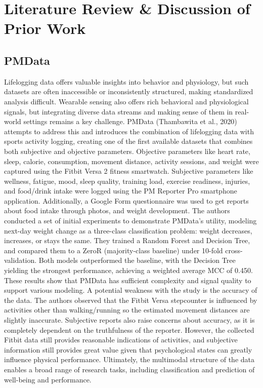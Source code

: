 \documentclass[12pt,letterpaper]{article}
\begin{document}
\section{Literature Review \& Discussion of Prior Work}

\subsection{PMData}
Lifelogging data offers valuable insights into behavior and physiology, but such datasets are often inaccessible or inconsistently structured, making standardized analysis difficult. Wearable sensing also offers rich behavioral and physiological signals, but integrating diverse data streams and making sense of them in real-world settings remains a key challenge. PMData (Thambawita et al., 2020) attempts to address this and introduces the combination of lifelogging data with sports activity logging, creating one of the first available datasets that combines both subjective and objective parameters. Objective parameters like heart rate, sleep, calorie, consumption, movement distance, activity sessions, and weight were captured using the Fitbit Versa 2 fitness smartwatch. Subjective parameters like wellness, fatigue, mood, sleep quality, training load, exercise readiness, injuries, and food/drink intake were logged using the PM Reporter Pro smartphone application. Additionally, a Google Form questionnaire was used to get reports about food intake through photos, and weight development. The authors conducted a set of initial experiments to demonstrate PMData’s utility, modeling next-day weight change as a three-class classification problem: weight decreases, increases, or stays the same. They trained a Random Forest and Decision Tree, and compared them to a ZeroR (majority-class baseline) under 10-fold cross-validation. Both models outperformed the baseline, with the Decision Tree yielding the strongest performance, achieving a weighted average MCC of 0.450. These results show that PMData has sufficient complexity and signal quality to support various modeling. A potential weakness with the study is the accuracy of the data. The authors observed that the Fitbit Versa stepcounter is influenced by activities other than walking/running so the estimated movement distances are slightly inaccurate. Subjective reports also raise concerns about accuracy, as it is completely dependent on the truthfulness of the reporter. However, the collected Fitbit data still provides reasonable indications of activities, and subjective information still provides great value given that psychological states can greatly influence physical performance. Ultimately, the multimodal structure of the data enables a broad range of research tasks, including classification and prediction of well-being and performance.
\end{document}
